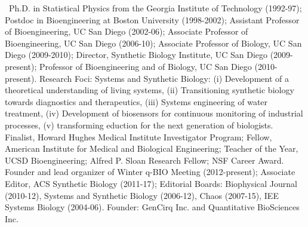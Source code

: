 \
Ph.D. in Statistical Physics from the Georgia Institute of Technology (1992-97); Postdoc in Bioengineering at Boston University (1998-2002); Assistant Professor of Bioengineering, UC San Diego (2002-06); Associate Professor of Bioengineering, UC San Diego (2006-10); Associate Professor of Biology, UC San Diego (2009-2010); Director, Synthetic Biology Institute, UC San Diego (2009-present); Professor of Bioengineering and of Biology, UC San Diego (2010-present).  Research Foci: Systems and Synthetic Biology:  (i) Development of a theoretical understanding of living systems, (ii) Transitioning synthetic biology towards diagnostics and therapeutics, (iii) Systems engineering of water treatment, (iv) Development of biosensors for continuous monitoring of industrial processes, (v) transforming eduction for the next generation of biologists.  Finalist, Howard Hughes Medical Institute Investigator Program; Fellow, American Institute for Medical and Biological Engineering; Teacher of the Year, UCSD Bioengineering; Alfred P. Sloan Research Fellow; NSF Career Award.  Founder and lead organizer of Winter q-BIO Meeting (2012-present); Associate Editor, ACS Synthetic Biology (2011-17); Editorial Boards: Biophysical Journal (2010-12), Systems and Synthetic Biology (2006-12), Chaos (2007-15), IEE Systems Biology (2004-06).  Founder:  GenCirq Inc. and Quantitative BioSciences Inc.  



